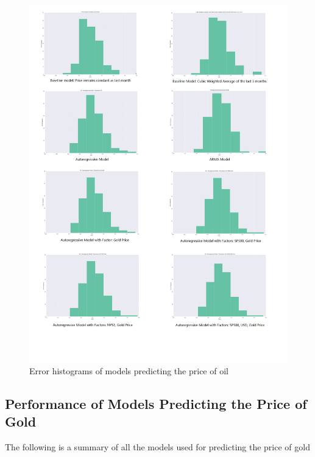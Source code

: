 \documentclass[runningheads]{llncs}
\begin{document}
\begin{figure}
\centering
\includegraphics[width=\textwidth]{OilErrorHistogram.png}
\caption{Error histograms of models predicting the price of oil}
\label{fig:OilErrorHistogram.png}
\end{figure}

\newpage

\subsection{Performance of Models Predicting the Price of Gold}

\noindent The following is a summary of all the models used for predicting the price of gold \\
 
\end{document}
